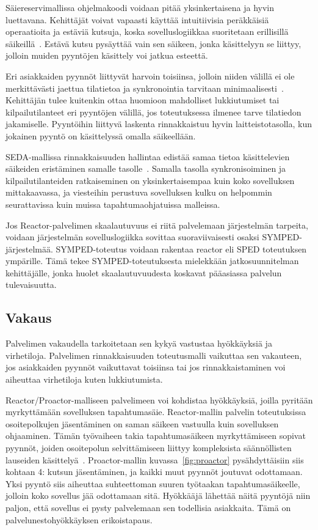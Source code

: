 \documentclass[finnish]{tktltiki2}
\theoremstyle{definition}
\theoremstyle{remark}
\begin{document}
Säiereservimallissa ohjelmakoodi voidaan pitää yksinkertaisena ja
hyvin luettavana. Kehittäjät voivat vapaasti käyttää intuitiivisia
peräkkäisiä operaatioita ja estäviä kutsuja, koska sovelluslogiikkaa
suoritetaan erillisillä säikeillä~\cite{pyarali_proactor_1997}. Estävä kutsu pysäyttää vain
sen säikeen, jonka käsittelyyn se liittyy, jolloin muiden
pyyntöjen käsittely voi jatkua esteettä.

Eri asiakkaiden pyynnöt liittyvät harvoin toisiinsa,
jolloin niiden välillä ei ole merkittävästi jaettua tilatietoa ja
synkronointia tarvitaan minimaalisesti~\cite{pyarali_proactor_1997}.
Kehittäjän tulee kuitenkin ottaa huomioon mahdolliset lukkiutumiset
tai kilpailutilanteet eri pyyntöjen välillä, jos
toteutuksessa ilmenee tarve tilatiedon jakamiselle.
Pyyntöihin liittyvä laskenta rinnakkaistuu hyvin laitteistotasolla,
kun jokainen pyyntö on käsittelyssä omalla säikeellään.

SEDA-mallissa rinnakkaisuuden hallintaa edistää
samaa tietoa käsittelevien säikeiden eristäminen samalle tasolle~\cite{welsh_seda_2001}.
Samalla tasolla synkronisoiminen ja kilpailutilanteiden ratkaiseminen on
yksinkertaisempaa kuin koko sovelluksen mittakaavassa, ja
viesteihin perustuva sovelluksen kulku on helpommin seurattavissa kuin
muissa tapahtumaohjatuissa malleissa.

Jos Reactor-palvelimen skaalautuvuus ei riitä palvelemaan
järjestelmän tarpeita, voidaan järjestelmän sovelluslogiikka
sovittaa suoraviivaisesti osaksi SYMPED-järjestelmää. SYMPED-toteutus
voidaan rakentaa reactor eli SPED toteutuksen ympärille. Tämä
tekee SYMPED-toteutuksesta mielekkään jatkosuunnitelman kehittäjälle,
jonka huolet skaalautuvuudesta koskavat pääasiassa palvelun tulevaisuutta.

\subsection{Vakaus}
Palvelimen vakaudella tarkoitetaan sen kykyä vastustaa hyökkäyksiä ja
virhetiloja.
Palvelimen rinnakkaisuuden toteutusmalli vaikuttaa sen vakauteen, jos asiakkaiden
pyynnöt vaikuttavat toisiinsa tai jos rinnakkaistaminen voi aiheuttaa virhetiloja kuten
lukkiutumista.

Reactor/Proactor-malliseen palvelimeen voi kohdistaa hyökkäyksiä, joilla pyritään
myrkyttämään sovelluksen tapahtumasäie. Reactor-mallin palvelin toteutuksissa
osoitepolkujen jäsentäminen on saman säikeen vastuulla kuin sovelluksen ohjaaminen.
Tämän työvaiheen takia
tapahtumasäikeen myrkyttämiseen sopivat pyynnöt,
joiden osoitepolun selvittämiseen liittyy kompleksista
säännöllisten lauseiden käsittelyä~\cite{davis_case_2017}.
Proactor-mallin kuvassa~\ref{fig:proactor} pysähdyttäisiin siis kohtaan 4: kutsun jäsentäminen, ja
kaikki muut pyynnöt joutuvat odottamaan.
Yksi pyyntö siis aiheuttaa suhteettoman suuren työtaakan
tapahtumasäikeelle, jolloin koko sovellus jää odottamaan sitä.
Hyökkääjä lähettää näitä pyyntöjä niin paljon, että sovellus
ei pysty palvelemaan sen todellisia asiakkaita. Tämä
on palvelunestohyökkäyksen erikoistapaus.
\end{document}
